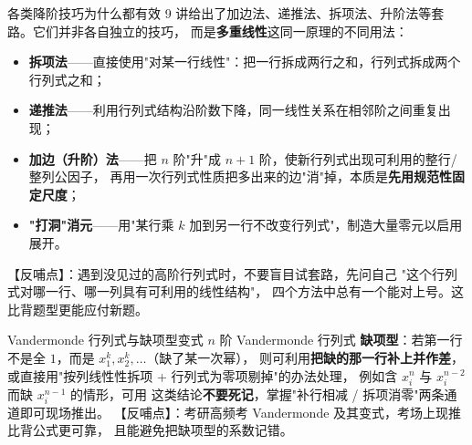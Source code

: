 \begin{fdeep}{各类降阶技巧为什么都有效}
9 讲给出了加边法、递推法、拆项法、升阶法等套路。它们并非各自独立的技巧，
而是\textbf{多重线性}这同一原理的不同用法：
\begin{itemize}[leftmargin=2.2em,itemsep=0.25em]
\item \textbf{拆项法}——直接使用"对某一行线性"：把一行拆成两行之和，行列式拆成两个行列式之和；
\item \textbf{递推法}——利用行列式结构沿阶数下降，同一线性关系在相邻阶之间重复出现；
\item \textbf{加边（升阶）法}——把 $n$ 阶"升"成 $n+1$ 阶，使新行列式出现可利用的整行/整列公因子，
      再用一次行列式性质把多出来的边"消"掉，本质是\textbf{先用规范性固定尺度}；
\item \textbf{"打洞"消元}——用"某行乘 $k$ 加到另一行不改变行列式"，制造大量零元以启用展开。
\end{itemize}
【反哺点】：遇到没见过的高阶行列式时，不要盲目试套路，先问自己
"这个行列式对哪一行、哪一列具有可利用的线性结构"，
四个方法中总有一个能对上号。这比背题型更能应付新题。
\end{fdeep}

\begin{fdeep}{Vandermonde 行列式与缺项型变式}
$n$ 阶 Vandermonde 行列式
\textbf{缺项型}：若第一行不是全 $1$，而是 $x_{1}^{k},x_{2}^{k},\dots$（缺了某一次幂），
则可利用\textbf{把缺的那一行补上并作差}，或直接用"按列线性性拆项 + 行列式为零项剔掉"的办法处理，
例如含 $x_{i}^{n}$ 与 $x_{i}^{n-2}$ 而缺 $x_{i}^{n-1}$ 的情形，可用
这类结论\textbf{不要死记}，掌握"补行相减 / 拆项消零"两条通道即可现场推出。
【反哺点】：考研高频考 Vandermonde 及其变式，考场上现推比背公式更可靠，
且能避免把缺项型的系数记错。
\end{fdeep}
